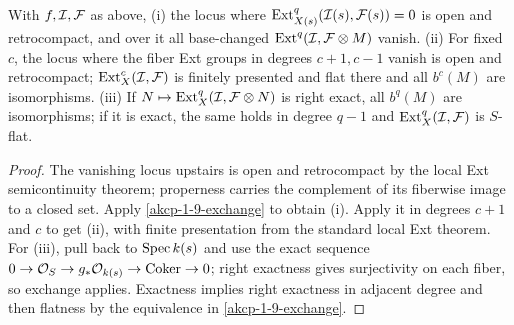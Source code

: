 \begin{theorem}
\label{akcp-1-10-open-ext}
With $f,\mathcal I,\mathcal F$ as above, (i) the locus where
$\operatorname{Ext}^q_{X(s)}(\mathcal I(s),\mathcal F(s))=0$ is open and retrocompact, and over it all
base-changed $\operatorname{Ext}^q(\mathcal I,\mathcal F\otimes M)$ vanish.  (ii) For fixed $c$, the locus
where the fiber Ext groups in degrees $c+1,c-1$ vanish is open and
retrocompact; $\operatorname{Ext}^c_X(\mathcal I,\mathcal F)$ is finitely presented and flat there and all
$b^c(M)$ are isomorphisms.  (iii) If $N\mapsto\operatorname{Ext}^q_X(\mathcal I,\mathcal F\otimes N)$ is
right exact, all $b^q(M)$ are isomorphisms; if it is exact, the same holds in
degree $q-1$ and $\operatorname{Ext}^q_X(\mathcal I,\mathcal F)$ is $S$-flat.
\end{theorem}
\begin{proof}
The vanishing locus upstairs is open and retrocompact by the local Ext
semicontinuity theorem; properness carries the complement of its fiberwise
image to a closed set.  Apply \cref{akcp-1-9-exchange} to obtain (i).  Apply it
in degrees $c+1$ and $c$ to get (ii), with finite presentation from the standard
local Ext theorem.  For (iii), pull back to $\operatorname{Spec} k(s)$ and use the exact
sequence $0\to\mathcal O_S\to g_*\mathcal O_{k(s)}\to\operatorname{Coker}\to0$; right exactness gives
surjectivity on each fiber, so exchange applies.  Exactness implies right
exactness in adjacent degree and then flatness by the equivalence in
\cref{akcp-1-9-exchange}.
\end{proof}
